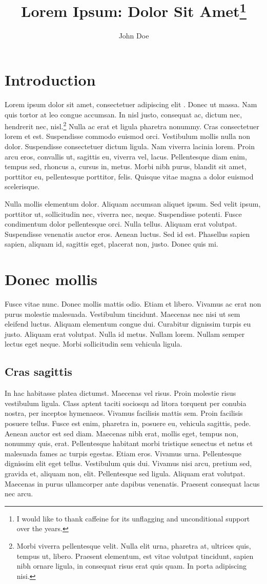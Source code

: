 \documentclass{cascadilla}
\title{Lorem Ipsum: Dolor Sit Amet\thanks{I would like to thank caffeine for its
unflagging and unconditional support over the years.}}
\author{John Doe}
\begin{document}
\maketitle

\section{Introduction}
Lorem ipsum dolor sit amet, consectetuer adipiscing elit \citet{Goodman1943}.
Donec ut massa. Nam quis tortor at leo congue accumsan. In nisl justo,
consequat ac, dictum nec, hendrerit nec, nisl.\footnote{Morbi viverra
pellentesque velit. Nulla elit urna, pharetra at, ultrices quis, tempus ut,
libero. Praesent elementum, est vitae volutpat tincidunt, sapien nibh ornare
ligula, in consequat risus erat quis quam. In porta adipiscing nisi.} Nulla ac
erat et ligula pharetra nonummy. Cras consectetuer lorem et est. Suspendisse
commodo euismod orci. Vestibulum mollis nulla non dolor. Suspendisse
consectetuer dictum ligula. Nam viverra lacinia lorem. Proin arcu eros,
convallis ut, sagittis eu, viverra vel, lacus.  Pellentesque diam enim, tempus
sed, rhoncus a, cursus in, metus. Morbi nibh purus, blandit sit amet,
porttitor eu, pellentesque porttitor, felis. Quisque vitae magna a dolor
euismod scelerisque.

Nulla mollis elementum dolor. Aliquam accumsan aliquet
\citet[3]{Shosted2006} ipsum. Sed velit ipsum, porttitor ut, sollicitudin
nec, viverra nec, neque. Suspendisse potenti. Fusce condimentum dolor
pellentesque orci. Nulla tellus. Aliquam erat volutpat.  Suspendisse venenatis
auctor eros. Aenean luctus. Sed id est. Phasellus sapien sapien, aliquam id,
sagittis eget, placerat non, justo. Donec quis mi.

\section{Donec mollis}
Fusce vitae nunc. Donec mollis mattis odio. Etiam et libero. Vivamus ac erat
non purus molestie malesuada. Vestibulum tincidunt. Maecenas nec nisi ut sem
eleifend luctus. Aliquam elementum congue dui. Curabitur dignissim turpis eu
justo. Aliquam erat volutpat. Nulla id metus. Nullam lorem. Nullam semper
lectus eget neque. Morbi sollicitudin sem vehicula ligula.

\subsection{Cras sagittis}
In hac habitasse platea dictumst. Maecenas vel risus. Proin molestie risus
vestibulum ligula. Class aptent taciti sociosqu ad litora torquent per conubia
nostra, per inceptos hymenaeos. Vivamus facilisis mattis sem. Proin facilisis
posuere tellus. Fusce est enim, pharetra in, posuere eu, vehicula sagittis,
pede. Aenean auctor est sed diam. Maecenas nibh erat, mollis eget, tempus non,
nonummy quis, erat. Pellentesque habitant morbi tristique senectus et netus et
malesuada fames ac turpis egestas. Etiam eros. Vivamus urna. Pellentesque
dignissim elit eget tellus. Vestibulum quis dui. Vivamus nisi arcu, pretium
sed, gravida et, aliquam non, elit. Pellentesque sed ligula. Aliquam erat
volutpat. Maecenas in purus ullamcorper ante dapibus venenatis. Praesent
consequat lacus nec arcu.
\end{document}
